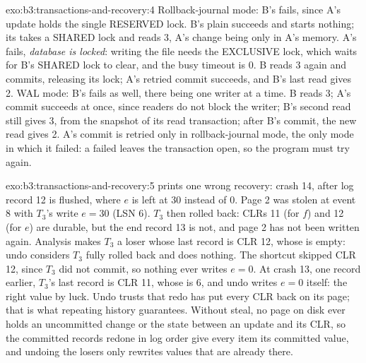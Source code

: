 \begin{solution}{exo:b3:transactions-and-recovery:4}
Rollback-journal mode: B's  fails, since A's update holds the single RESERVED lock. B's plain  succeeds and starts nothing; its  takes a SHARED lock and reads 3, A's change being only in A's memory. A's  fails, \emph{database is locked}: writing the file needs the EXCLUSIVE lock, which waits for B's SHARED lock to clear, and the busy timeout is 0. B reads 3 again and commits, releasing its lock; A's retried commit succeeds, and B's last read gives 2. WAL mode: B's  fails as well, there being one writer at a time. B reads 3; A's commit succeeds at once, since readers do not block the writer; B's second read still gives 3, from the snapshot of its read transaction; after B's commit, the new read gives 2. A's commit is retried only in rollback-journal mode, the only mode in which it failed: a failed  leaves the transaction open, so the program must try again.
\end{solution}

\begin{solution}{exo:b3:transactions-and-recovery:5}
 prints one wrong recovery: crash 14, after log record 12 is flushed, where $e$ is left at 30 instead of 0. Page 2 was stolen at event 8 with $T_3$'s write $e = 30$ (LSN 6). $T_3$ then rolled back: CLRs 11 (for $f$) and 12 (for $e$) are durable, but the end record 13 is not, and page 2 has not been written again. Analysis makes $T_3$ a loser whose last record is CLR 12, whose  is empty: undo considers $T_3$ fully rolled back and does nothing. The shortcut skipped CLR 12, since $T_3$ did not commit, so nothing ever writes $e = 0$. At crash 13, one record earlier, $T_3$'s last record is CLR 11, whose  is 6, and undo writes $e = 0$ itself: the right value by luck. Undo trusts that redo has put every CLR back on its page; that is what repeating history guarantees. Without steal, no page on disk ever holds an uncommitted change or the state between an update and its CLR, so the committed records redone in log order give every item its committed value, and undoing the losers only rewrites values that are already there.
\end{solution}

